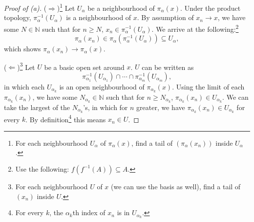 \documentclass[../../main.tex]{subfiles}
\begin{document}
\begin{proof}[Proof of (a)]
	($\Rightarrow$)\footnote{For each neighbourhood $U_\alpha$ of $\pi_\alpha(x)$, find a tail of $(\pi_\alpha(x_n))$ inside $U_\alpha$.}
	Let $U_\alpha$ be a neighbourhood of $\pi_\alpha(x)$.
	Under the product topology, $\pi^{-1}_\alpha(U_\alpha)$ is a neighbourhood of $x$.
	By assumption of $x_n \to x$, we have some $N \in \mathbb{N}$ such that for $n \ge N$, $x_n \in \pi^{-1}_\alpha(U_\alpha)$.
	We arrive at the following:\footnote{Use the following: $f(f^{-1}(A)) \subseteq A$.}
	\[
		\pi_\alpha(x_n) \in \pi_\alpha(\pi_\alpha^{-1}(U_\alpha)) \subseteq U_\alpha,
	\]
	which shows $\pi_\alpha(x_n) \to \pi_\alpha(x)$.

	($\Leftarrow$)\footnote{For each neighbourhood $U$ of $x$ (we can use the basis as well), find a tail of $(x_n)$ inside $U$.}
	Let $U$ be a basic open set around $x$.
	$U$ can be written as
	\[
		\pi_{\alpha_1}^{-1}(U_{\alpha_1}) \cap \cdots \cap \pi_{\alpha_m}^{-1}(U_{\alpha_m}),
	\]
	in which each $U_{\alpha_k}$ is an open neighbourhood of $\pi_{\alpha_k}(x)$.
	Using the limit of each $\pi_{\alpha_k}(x_n)$, we have some $N_{\alpha_k} \in \mathbb{N}$ such that for $n \ge N_{\alpha_k}$, $\pi_{\alpha_k}(x_n) \in U_{\alpha_k}$.
	We can take the largest of the $N_{\alpha_k}$'s, in which for $n$ greater, we have $\pi_{\alpha_k}(x_n) \in U_{\alpha_k}$ for every $k$.
    By definition\footnote{For every $k$, the $\alpha_k$th index of $x_n$ is in $U_{\alpha_k}$.}
    this means $x_n \in U$.
\end{proof}
\end{document}
